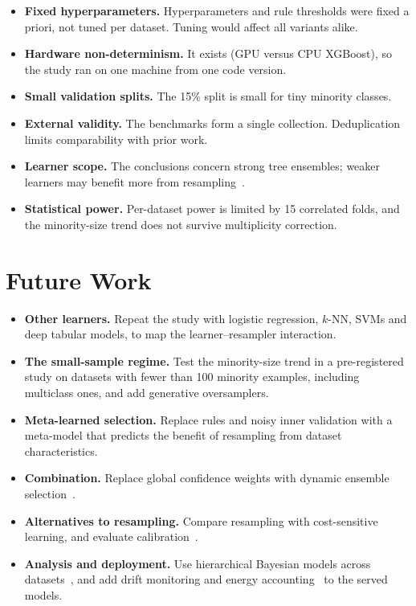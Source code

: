 \begin{itemize}
  \item \textbf{Fixed hyperparameters.} Hyperparameters and rule thresholds were fixed a priori, not tuned per
        dataset. Tuning would affect all variants alike.
  \item \textbf{Hardware non-determinism.} It exists (GPU versus CPU XGBoost), so the study ran on one machine from
        one code version.
  \item \textbf{Small validation splits.} The 15\% split is small for tiny minority classes.
  \item \textbf{External validity.} The benchmarks form a single collection. Deduplication limits comparability with
        prior work.
  \item \textbf{Learner scope.} The conclusions concern strong tree ensembles; weaker learners may benefit more from
        resampling~\cite{vanhulse2007experimental}.
  \item \textbf{Statistical power.} Per-dataset power is limited by 15 correlated folds, and the minority-size trend
        does not survive multiplicity correction.
\end{itemize}

\section{Future Work}\label{sec:future}
\begin{itemize}
  \item \textbf{Other learners.} Repeat the study with logistic regression, $k$-NN, SVMs and deep tabular models, to
        map the learner--resampler interaction.
  \item \textbf{The small-sample regime.} Test the minority-size trend in a pre-registered study on datasets with
        fewer than 100 minority examples, including multiclass ones, and add generative oversamplers.
  \item \textbf{Meta-learned selection.} Replace rules and noisy inner validation with a meta-model that predicts the
        benefit of resampling from dataset characteristics.
  \item \textbf{Combination.} Replace global confidence weights with dynamic ensemble selection~\cite{cruz2018dynamic}.
  \item \textbf{Alternatives to resampling.} Compare resampling with cost-sensitive learning, and evaluate
        calibration~\cite{vandengoorbergh2022harm}.
  \item \textbf{Analysis and deployment.} Use hierarchical Bayesian models across datasets~\cite{benavoli2017time},
        and add drift monitoring and energy accounting~\cite{plan_p10_stacking} to the served models.
\end{itemize}

